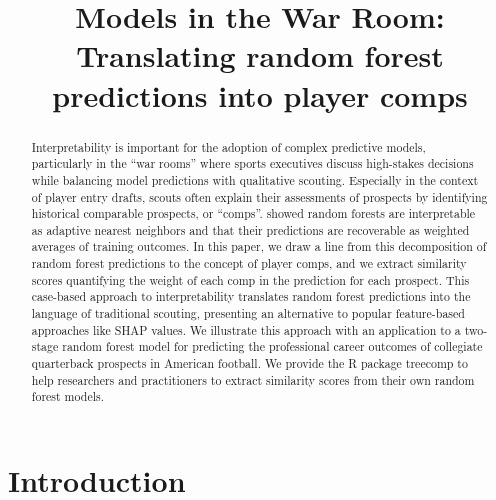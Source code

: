 \documentclass[Review, sageh, times, doublespace]{sagej}
\begin{document}

\title{Models in the War Room: Translating random forest predictions into player comps}

%
%
%

\begin{abstract}
  Interpretability is important for the adoption of complex predictive models, particularly in the ``war rooms'' where sports executives discuss high-stakes decisions while balancing model predictions with qualitative scouting. Especially in the context of player entry drafts, scouts often explain their assessments of prospects by identifying historical comparable prospects, or ``comps''. \citet{lin_random_2006} showed random forests are interpretable as adaptive nearest neighbors and that their predictions are recoverable as weighted averages of training outcomes. In this paper, we draw a line from this decomposition of random forest predictions to the concept of player comps, and we extract similarity scores quantifying the weight of each comp in the prediction for each prospect. This case-based approach to interpretability translates random forest predictions into the language of traditional scouting, presenting an alternative to popular feature-based approaches like SHAP values. We illustrate this approach with an application to a two-stage random forest model for predicting the professional career outcomes of collegiate quarterback prospects in American football. We provide the R package treecomp to help researchers and practitioners to extract similarity scores from their own random forest models.
\end{abstract}


\maketitle

\section{Introduction}
\end{document}
